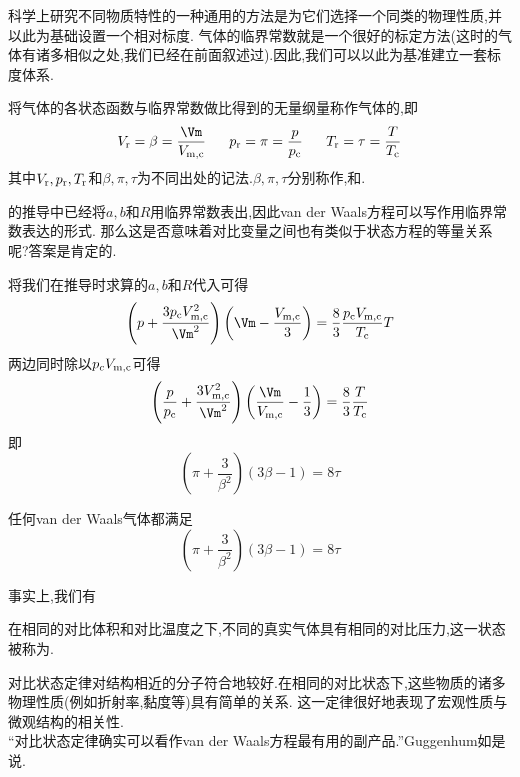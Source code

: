 \documentclass{ctexart}
\begin{document}
\indent 科学上研究不同物质特性的一种通用的方法是为它们选择一个同类的物理性质,并以此为基础设置一个相对标度.%
气体的临界常数就是一个很好的标定方法(这时的气体有诸多相似之处,我们已经在前面叙述过).因此,我们可以以此为基准建立一套标度体系.
\begin{definition}[1C.3.5 对比变量]
    将气体的各状态函数与临界常数做比得到的无量纲量称作气体的,即
    \[V_\text r=\beta=\dfrac{\Vm}{V_{\text m,\text c}}\ \ \ \ \ p_\text r=\pi=\dfrac{p}{p_\text c}\ \ \ \ \ T_\text r=\tau=\dfrac{T}{T_\text c}\]
    其中$V_\text r,p_\text r,T_\text r$和$\beta,\pi,\tau$为不同出处的记法.$\beta,\pi,\tau$分别称作,和.
\end{definition}
的推导中已经将$a,b$和$R$用临界常数表出,因此van der Waals方程可以写作用临界常数表达的形式.%
那么这是否意味着对比变量之间也有类似于状态方程的等量关系呢?答案是肯定的.
\begin{derivation}
将我们在推导时求算的$a,b$和$R$代入可得
\[\left(p+\dfrac{3p_\text cV_{\text m,\text c}^2}{\Vm^2}\right)\left(\Vm-\dfrac{V_{\text m,\text c}}{3}\right)=\dfrac83\dfrac{p_\text cV_{\text m,\text c}}{T_\text c}T\]
两边同时除以$p_cV_{\text m,\text c}$可得
\[\left(\dfrac{p}{p_\text c}+\dfrac{3V_{\text m,\text c}^2}{\Vm^2}\right)\left(\dfrac{\Vm}{V_{\text m,\text c}}-\dfrac{1}{3}\right)=\dfrac83\dfrac{T}{T_\text c}\]
即
\[\left(\pi+\dfrac{3}{\beta^2}\right)\left(3\beta-1\right)=8\tau\]

\end{derivation}
\begin{theorem}
    任何van der Waals气体都满足
    \[\left(\pi+\dfrac{3}{\beta^2}\right)\left(3\beta-1\right)=8\tau\]
    
\end{theorem}
事实上,我们有
\begin{theorem}[1C.3.7 对比状态定律]
    在相同的对比体积和对比温度之下,不同的真实气体具有相同的对比压力,这一状态被称为.
\end{theorem}
对比状态定律对结构相近的分子符合地较好.在相同的对比状态下,这些物质的诸多物理性质(例如折射率,黏度等)具有简单的关系.%
这一定律很好地表现了宏观性质与微观结构的相关性.\\
\indent “对比状态定律确实可以看作van der Waals方程最有用的副产品.”Guggenhum如是说.
\end{document}
